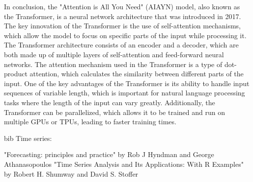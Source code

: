 In conclusion, the "Attention is All You Need" (AIAYN) model, also known as the Transformer, is a neural network architecture that was introduced in 2017.
The key innovation of the Transformer is the use of self-attention mechanisms, which allow the model to focus on specific parts of the input while processing it.
The Transformer architecture consists of an encoder and a decoder, which are both made up of multiple layers of self-attention and feed-forward neural networks.
The attention mechanism used in the Transformer is a type of dot-product attention, which calculates the similarity between different parts of the input.
One of the key advantages of the Transformer is its ability to handle input sequences of variable length, which is important for natural language processing tasks where the length of the input can vary greatly. 
Additionally, the Transformer can be parallelized, which allows it to be trained and run on multiple GPUs or TPUs, leading to faster training times.

bib
Time series:

\cite{Hyndman2018} "Forecasting: principles and practice" by Rob J Hyndman and George Athanasopoulos
\cite{Shumway2017} "Time Series Analysis and Its Applications: With R Examples" by Robert H. Shumway and David S. Stoffer

